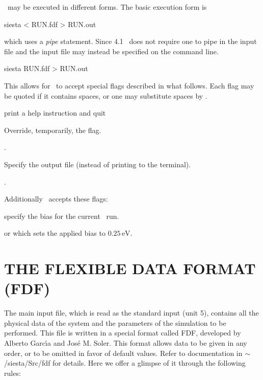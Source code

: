\siesta\ may be executed in different forms. The basic execution form
is
\begin{shellexample}
  siesta < RUN.fdf > RUN.out
\end{shellexample}
which uses a \emph{pipe} statement. 
%
Since 4.1 \siesta\ does not require one to pipe in the input file and
the input file may instead be specified on the command line.
\begin{shellexample}
  siesta RUN.fdf > RUN.out
\end{shellexample}
This allows for \siesta\ to accept special flags described in what
follows. Each flag may be quoted if it contains spaces, or one may
substitute spaces by \fdf*{:}.
\begin{fdfoptions}

  \option[-h]%
  print a help instruction and quit

  \option[-L]%
  Override, temporarily, the  flag. 

  .

  \option[-out|-o]%
  Specify the output file (instead of printing to the terminal).

  .

\end{fdfoptions}
Additionally \tsiesta\ accepts these flags:
\begin{fdfoptions}

  \option[-V]%
  specify the bias for the current \tsiesta\ run. 

   or 
  which sets the applied bias to $0.25\,\mathrm{eV}$.

\end{fdfoptions}


\section{THE FLEXIBLE DATA FORMAT (FDF)}

The main input file,
which is read as the standard input (unit 5),
contains all the physical data of the system and the parameters of
the simulation to be performed.
This file is written in a special format called FDF, developed by
Alberto Garc\'{\i}a and Jos\'e M. Soler. This format allows data to be
given in any order, or to be omitted in favor of default values.
Refer to documentation in $\sim$/siesta/Src/fdf for details.
Here we offer a glimpse of it through the following rules:

